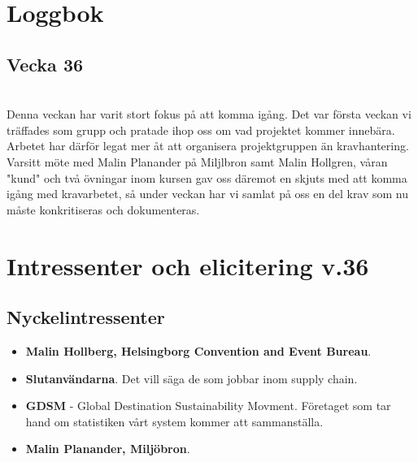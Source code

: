 \documentclass{article}
\date {#1}
\title {
    \documentNumber {01}    

    \documentTitle {Helsingborg Event and Convention Bureau}
    
    \documentDate {2021-08-12}
    
    \author{Anna Bergvall - Oscar Blixt - Pontus Persson - Filip Sjövall - David Vilppu}
}
\begin{document}
\maketitle

\thispagestyle{empty}

\newpage

\tableofcontents


\newpage

\section{Loggbok}
    \subsection{Vecka 36}
    \\
    Denna veckan har varit stort fokus på att komma igång. Det var första veckan vi träffades som grupp och pratade ihop oss om vad projektet kommer innebära. Arbetet har därför legat mer åt att organisera projektgruppen än kravhantering. \\ Varsitt möte med Malin Planander på Miljlbron samt Malin Hollgren, våran "kund" och två övningar inom kursen gav oss däremot en skjuts med att komma igång med kravarbetet, så under veckan har vi samlat på oss en del krav som nu måste konkritiseras och dokumenteras. 
    
    \newpage
    

\section{Intressenter och elicitering v.36}

    \subsection{Nyckelintressenter}
        \begin{itemize}
            \item \textbf{Malin Hollberg, Helsingborg Convention and Event Bureau}.
                \\
            \item \textbf{Slutanvändarna}. Det vill säga de som jobbar inom supply chain.
                \\
            \item \textbf{GDSM} - Global Destination Sustainability Movment. Företaget som tar hand om statistiken vårt system kommer att sammanställa.
             \\
            \item \textbf{Malin Planander, Miljöbron}.
        \end{itemize}
        
\end{document}
